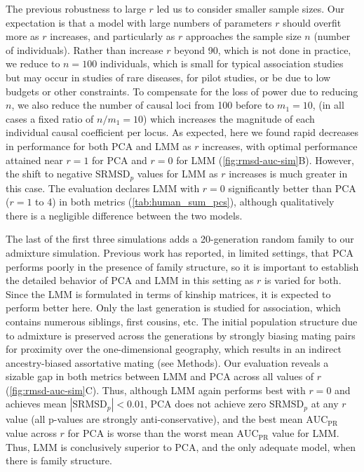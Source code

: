 \documentclass[11pt]{article}
\newcommand{\rmsd}{\text{SRMSD}_p}
\newcommand{\auc}{\text{AUC}_\text{PR}}
\begin{document}
The previous robustness to large $r$ led us to consider smaller sample sizes.
Our expectation is that a model with large numbers of parameters $r$ should overfit more as $r$ increases, and particularly as $r$ approaches the sample size $n$ (number of individuals).
Rather than increase $r$ beyond 90, which is not done in practice, we reduce to $n = 100$ individuals, which is small for typical association studies but may occur in studies of rare diseases, for pilot studies, or be due to low budgets or other constraints.
To compensate for the loss of power due to reducing $n$, we also reduce the number of causal loci from 100 before to $m_1 = 10$, (in all cases a fixed ratio of $n / m_1 = 10$) which increases the magnitude of each individual causal coefficient per locus.
As expected, here we found rapid decreases in performance for both PCA and LMM as $r$ increases, with optimal performance attained near $r=1$ for PCA and $r=0$ for LMM (\cref{fig:rmsd-auc-sim}B).
However, the shift to negative $\rmsd$ values for LMM as $r$ increases is much greater in this case.
The evaluation declares LMM with $r=0$ significantly better than PCA ($r=1$ to 4) in both metrics (\cref{tab:human_sum_pcs}), although qualitatively there is a negligible difference between the two models.

The last of the first three simulations adds a 20-generation random family to our admixture simulation.
Previous work has reported, in limited settings, that PCA performs poorly in the presence of family structure, so it is important to establish the detailed behavior of PCA and LMM in this setting as $r$ is varied for both.
Since the LMM is formulated in terms of kinship matrices, it is expected to perform better here.
Only the last generation is studied for association, which contains numerous siblings, first cousins, etc.
The initial population structure due to admixture is preserved across the generations by strongly biasing mating pairs for proximity over the one-dimensional geography, which results in an indirect ancestry-biased assortative mating (see Methods).
Our evaluation reveals a sizable gap in both metrics between LMM and PCA across all values of $r$ (\cref{fig:rmsd-auc-sim}C).
Thus, although LMM again performs best with $r=0$ and achieves mean $|\rmsd| < 0.01$, PCA does not achieve zero $\rmsd$ at any $r$ value (all p-values are strongly anti-conservative), and the best mean $\auc$ value across $r$ for PCA is worse than the worst mean $\auc$ value for LMM.
Thus, LMM is conclusively superior to PCA, and the only adequate model, when there is family structure.
\end{document}
